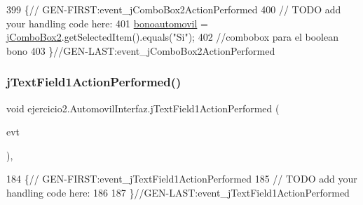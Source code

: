 \begin{DoxyCode}
399                                                                            \{\textcolor{comment}{//
      GEN-FIRST:event\_jComboBox2ActionPerformed}
400         \textcolor{comment}{// TODO add your handling code here:}
401         \mbox{\hyperlink{classejercicio2_1_1_automovil_interfaz_a3d93aa54c482a013e91c862171f66bac}{bonoautomovil}} = \mbox{\hyperlink{classejercicio2_1_1_automovil_interfaz_a787595d150a8ebd65cb621823b577788}{jComboBox2}}.getSelectedItem().equals(\textcolor{stringliteral}{"Si"});
402         \textcolor{comment}{//combobox para el boolean bono}
403     \}\textcolor{comment}{//GEN-LAST:event\_jComboBox2ActionPerformed}
\end{DoxyCode}
\mbox{\label{classejercicio2_1_1_automovil_interfaz_adb96511f1a6c95b416fd5a73c235d1de}} 
\subsubsection{\texorpdfstring{j\+Text\+Field1\+Action\+Performed()}{jTextField1ActionPerformed()}}
{\footnotesize\ttfamily void ejercicio2.\+Automovil\+Interfaz.\+j\+Text\+Field1\+Action\+Performed (\begin{DoxyParamCaption}\item[{java.\+awt.\+event.\+Action\+Event}]{evt }\end{DoxyParamCaption})\hspace{0.3cm}{\ttfamily [inline]}, {\ttfamily [private]}}


\begin{DoxyCode}
184                                                                             \{\textcolor{comment}{//
      GEN-FIRST:event\_jTextField1ActionPerformed}
185         \textcolor{comment}{// TODO add your handling code here:}
186         
187     \}\textcolor{comment}{//GEN-LAST:event\_jTextField1ActionPerformed}
\end{DoxyCode}
\mbox{\label{classejercicio2_1_1_automovil_interfaz_a43fe7b51e7afb9b0d0d513fb72f35ee3}} 

